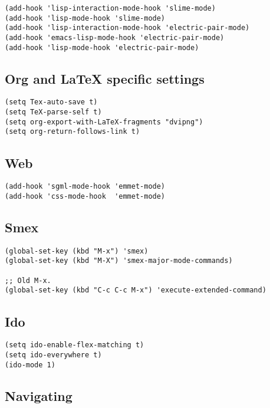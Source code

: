 \documentclass[11pt]{article}
\begin{document}
\begin{verbatim}
(add-hook 'lisp-interaction-mode-hook 'slime-mode)
(add-hook 'lisp-mode-hook 'slime-mode)
(add-hook 'lisp-interaction-mode-hook 'electric-pair-mode)
(add-hook 'emacs-lisp-mode-hook 'electric-pair-mode)
(add-hook 'lisp-mode-hook 'electric-pair-mode)
\end{verbatim}


\subsection{Org and \LaTeX{} specific settings}
\label{sec-1-3}

\begin{verbatim}
(setq Tex-auto-save t)
(setq TeX-parse-self t)
(setq org-export-with-LaTeX-fragments "dvipng")
(setq org-return-follows-link t)
\end{verbatim}


\subsection{Web}
\label{sec-1-4}

\begin{verbatim}
(add-hook 'sgml-mode-hook 'emmet-mode)
(add-hook 'css-mode-hook  'emmet-mode)
\end{verbatim}


\subsection{Smex}
\label{sec-1-5}

\begin{verbatim}
(global-set-key (kbd "M-x") 'smex)
(global-set-key (kbd "M-X") 'smex-major-mode-commands)

;; Old M-x.
(global-set-key (kbd "C-c C-c M-x") 'execute-extended-command)
\end{verbatim}


\subsection{Ido}
\label{sec-1-6}

\begin{verbatim}
(setq ido-enable-flex-matching t)
(setq ido-everywhere t)
(ido-mode 1)
\end{verbatim}


\subsection{Navigating}
\label{sec-1-7}
\end{document}
